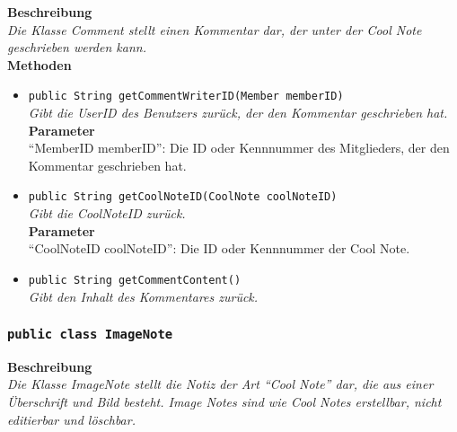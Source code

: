	\textbf{Beschreibung} \\
	\textit{Die Klasse Comment stellt einen Kommentar dar, der unter der Cool Note geschrieben werden kann.} \\
	
	\textbf{Methoden}
	\begin{itemize}
		\item\texttt{{public String getCommentWriterID(Member memberID)}}\\
		\textit{Gibt die UserID des Benutzers zurück, der den Kommentar geschrieben hat.}\\
		\textbf{Parameter}\\
		“MemberID memberID”: Die ID oder Kennnummer des Mitglieders, der den Kommentar geschrieben hat.\\
		
		\item\texttt{{public String getCoolNoteID(CoolNote coolNoteID)}}\\
		\textit{Gibt die CoolNoteID zurück.}\\
		\textbf{Parameter}\\
		“CoolNoteID coolNoteID”: Die ID oder Kennnummer der Cool Note.\\
		
		\item\texttt{{public String getCommentContent()}}\\
		\textit{Gibt den Inhalt des Kommentares zurück.}\\
	\end{itemize}

\subsubsection{\texttt{public class ImageNote}}

	\textbf{Beschreibung} \\
	\textit{Die Klasse ImageNote stellt die Notiz der Art “Cool Note” dar, die aus einer Überschrift und Bild besteht. Image Notes sind wie Cool Notes erstellbar, nicht editierbar und löschbar.} \\
	
